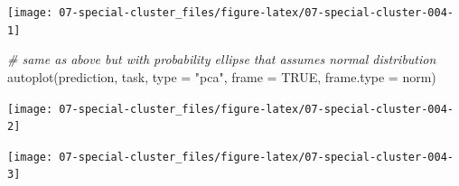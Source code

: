 \documentclass[
]{scrbook}
\newenvironment{Shaded}{\begin{snugshade}}{\end{snugshade}}
\newcommand{\AttributeTok}[1]{\textcolor[rgb]{0.77,0.63,0.00}{#1}}
\newcommand{\CommentTok}[1]{\textcolor[rgb]{0.56,0.35,0.01}{\textit{#1}}}
\newcommand{\ConstantTok}[1]{\textcolor[rgb]{0.00,0.00,0.00}{#1}}
\newcommand{\FunctionTok}[1]{\textcolor[rgb]{0.00,0.00,0.00}{#1}}
\newcommand{\NormalTok}[1]{#1}
\newcommand{\OtherTok}[1]{\textcolor[rgb]{0.56,0.35,0.01}{#1}}
\newcommand{\SpecialCharTok}[1]{\textcolor[rgb]{0.00,0.00,0.00}{#1}}
\newcommand{\StringTok}[1]{\textcolor[rgb]{0.31,0.60,0.02}{#1}}
\renewenvironment{Shaded} {\begin{snugshade}\small} {\end{snugshade}}
\begin{document}
\begin{center}\texttt{[image: 07-special-cluster\_files/figure-latex/07-special-cluster-004-1]} \end{center}

\begin{Shaded}
\begin{Highlighting}[]
\CommentTok{\# same as above but with probability ellipse that assumes normal distribution}
\FunctionTok{autoplot}\NormalTok{(prediction, task, }\AttributeTok{type =} \StringTok{"pca"}\NormalTok{, }\AttributeTok{frame =} \ConstantTok{TRUE}\NormalTok{, }\AttributeTok{frame.type =} \StringTok{\textquotesingle{}norm\textquotesingle{}}\NormalTok{)}
\end{Highlighting}
\end{Shaded}

\begin{center}\texttt{[image: 07-special-cluster\_files/figure-latex/07-special-cluster-004-2]} \end{center}

\begin{Shaded}
\end{Shaded}

\begin{center}\texttt{[image: 07-special-cluster\_files/figure-latex/07-special-cluster-004-3]} \end{center}

\begin{Shaded}
\end{Shaded}
\end{document}
